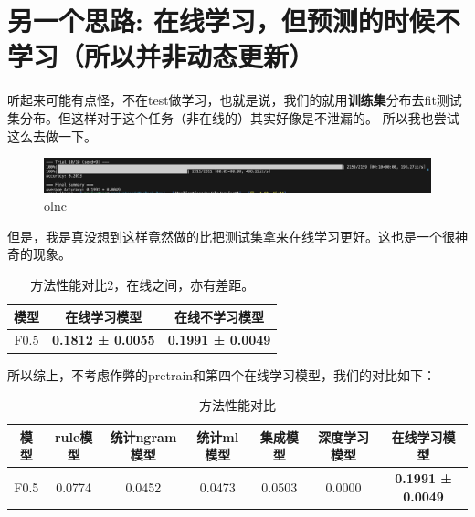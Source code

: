 \documentclass[answers]{exam}  %
\begin{document}
\section{另一个思路: 在线学习，但预测的时候不学习（所以并非动态更新）}

    听起来可能有点怪，不在test做学习，也就是说，我们的就用\textbf{训练集}分布去fit测试集分布。但这样对于这个任务（非在线的）其实好像是不泄漏的。
    所以我也尝试这么去做一下。

    \begin{figure}[H]
        \centering
        \label{olnc}
        \includegraphics[width=.6\textwidth]{../pic/olnc.png} 
        \caption{olnc}  
    \end{figure}
    

    但是，我是真没想到这样竟然做的比把测试集拿来在线学习更好。这也是一个很神奇的现象。
    \begin{table}[h]
        \centering
        \begin{tabular}{ccc}
        \toprule
        \textbf{模型} & \textbf{在线学习模型} & \textbf{在线不学习模型}\\
        \midrule
        F0.5 & \textbf{0.1812 ± 0.0055} & \textbf{0.1991 ± 0.0049}  \\
        \bottomrule
        \end{tabular}
        \caption{方法性能对比2，在线之间，亦有差距。}
    \end{table}

    所以综上，不考虑作弊的pretrain和第四个在线学习模型，我们的对比如下：
    \begin{table}[h]
        \centering
        \begin{tabular}{ccccccc}
        \toprule
        \textbf{模型} & \textbf{rule模型} & \textbf{统计ngram模型} & \textbf{统计ml模型} & \textbf{集成模型} & \textbf{深度学习模型} & \textbf{在线学习模型}\\
        \midrule
        F0.5 & 0.0774 & 0.0452 & 0.0473 & 0.0503 & 0.0000 & \textbf{0.1991 ± 0.0049} \\
        \bottomrule
        \end{tabular}
        \caption{方法性能对比}
    \end{table}
\end{document}
